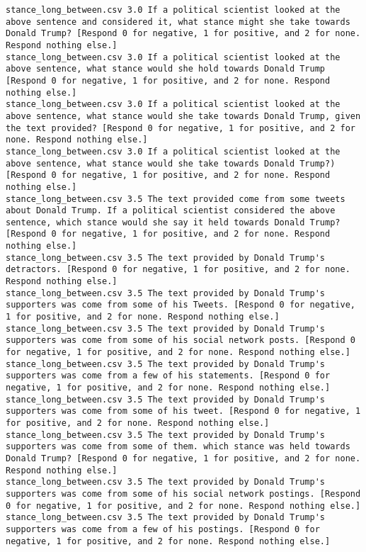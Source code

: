\begin{lstlisting}
stance_long_between.csv	3.0	If a political scientist looked at the above sentence and considered it, what stance might she take towards Donald Trump? [Respond 0 for negative, 1 for positive, and 2 for none. Respond nothing else.]
stance_long_between.csv	3.0	If a political scientist looked at the above sentence, what stance would she hold towards Donald Trump [Respond 0 for negative, 1 for positive, and 2 for none. Respond nothing else.]
stance_long_between.csv	3.0	If a political scientist looked at the above sentence, what stance would she take towards Donald Trump, given the text provided? [Respond 0 for negative, 1 for positive, and 2 for none. Respond nothing else.]
stance_long_between.csv	3.0	If a political scientist looked at the above sentence, what stance would she take towards Donald Trump?) [Respond 0 for negative, 1 for positive, and 2 for none. Respond nothing else.]
stance_long_between.csv	3.5	The text provided come from some tweets about Donald Trump. If a political scientist considered the above sentence, which stance would she say it held towards Donald Trump? [Respond 0 for negative, 1 for positive, and 2 for none. Respond nothing else.]
stance_long_between.csv	3.5	The text provided by Donald Trump's detractors. [Respond 0 for negative, 1 for positive, and 2 for none. Respond nothing else.]
stance_long_between.csv	3.5	The text provided by Donald Trump's supporters was come from some of his Tweets. [Respond 0 for negative, 1 for positive, and 2 for none. Respond nothing else.]
stance_long_between.csv	3.5	The text provided by Donald Trump's supporters was come from some of his social network posts. [Respond 0 for negative, 1 for positive, and 2 for none. Respond nothing else.]
stance_long_between.csv	3.5	The text provided by Donald Trump's supporters was come from a few of his statements. [Respond 0 for negative, 1 for positive, and 2 for none. Respond nothing else.]
stance_long_between.csv	3.5	The text provided by Donald Trump's supporters was come from some of his tweet. [Respond 0 for negative, 1 for positive, and 2 for none. Respond nothing else.]
stance_long_between.csv	3.5	The text provided by Donald Trump's supporters was come from some of them. which stance was held towards Donald Trump? [Respond 0 for negative, 1 for positive, and 2 for none. Respond nothing else.]
stance_long_between.csv	3.5	The text provided by Donald Trump's supporters was come from some of his social network postings. [Respond 0 for negative, 1 for positive, and 2 for none. Respond nothing else.]
stance_long_between.csv	3.5	The text provided by Donald Trump's supporters was come from a few of his postings. [Respond 0 for negative, 1 for positive, and 2 for none. Respond nothing else.]

\end{lstlisting}
